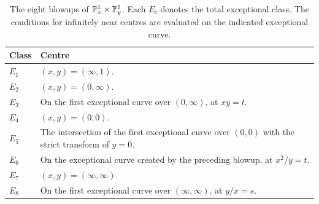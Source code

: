 \begin{table}[htbp]
\centering
\caption{The eight blowups of \(\mathbb P^1_x\times\mathbb P^1_y\).
Each \(E_i\) denotes the total exceptional class. The conditions for
infinitely near centres are evaluated on the indicated exceptional curve.}
\label{tab:blowups}
\begin{tabularx}{\textwidth}{@{}lX@{}}
\toprule
Class & Centre \\
\midrule
\(E_1\) & \((x,y)=(\infty,1)\). \\
\(E_2\) & \((x,y)=(0,\infty)\). \\
\(E_3\) & On the first exceptional curve over \((0,\infty)\), at \(xy=t\). \\
\(E_4\) & \((x,y)=(0,0)\). \\
\(E_5\) & The intersection of the first exceptional curve over \((0,0)\)
with the strict transform of \(y=0\). \\
\(E_6\) & On the exceptional curve created by the preceding blowup, at \(x^2/y=t\). \\
\(E_7\) & \((x,y)=(\infty,\infty)\). \\
\(E_8\) & On the first exceptional curve over \((\infty,\infty)\), at \(y/x=s\). \\
\bottomrule
\end{tabularx}
\end{table}
